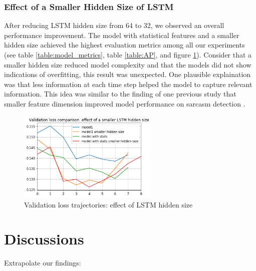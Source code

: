 \documentclass[12pt]{diazessay} %
\begin{document}

\subsubsection{Effect of a Smaller Hidden Size of LSTM} %
\label{ssub:effect_of_a_smaller_hidden_size_of_lstm}

After reducing LSTM hidden size from 64 to 32, we observed an overall performance improvement. The model with statistical features and a smaller hidden size achieved the highest evaluation metrics among all our experiments (see table \ref{table:model_metrics}, table \ref{table:AP}, and figure \ref{figure:hidden_size}). Consider that a smaller hidden size reduced model complexity and that the models did not show indications of overfitting, this result was unexpected. One plausible explaination was that less information at each time step helped the model to capture relevant information. This idea was similar to the finding of one previous study that smaller feature dimension improved model performance on sarcasm detection \citep{ghosh2016}. 

\begin{figure}[h!]
    \centering
    \includegraphics[width=0.6\textwidth]{graphs/loss_plots/hidden_size.png}
    \caption{Validation loss trajectories: effect of LSTM hidden size}
    \label{figure:hidden_size}
\end{figure}





\section{Discussions}


Extrapolate our findings:
\end{document}
